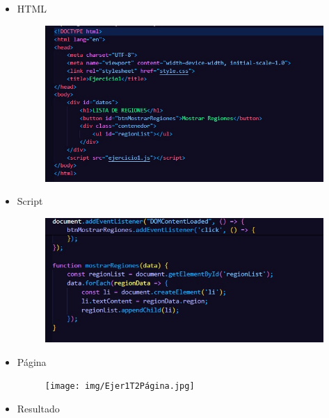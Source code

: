 \documentclass{article}
\begin{document}
	\begin{itemize}
		\item HTML
		\begin{figure}[H]
			\centering
			\includegraphics[width=1.0\textwidth,keepaspectratio]{img/Ejer1T2HTML.jpg}
		\end{figure}
		\item Script
		\begin{figure}[H]
			\centering
			\includegraphics[width=1.0\textwidth,keepaspectratio]{img/Ejer1T2Script.jpg}
		\end{figure}
		\item Página
		\begin{figure}[H]
			\centering
			\texttt{[image: img/Ejer1T2Página.jpg]}
		\end{figure}
		\item Resultado
		\begin{figure}[H]
			\centering

\end{figure}
\end{itemize}
\end{document}
